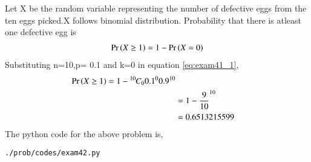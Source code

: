 Let X be the random variable representing the number of defective eggs from the ten eggs picked.X follows binomial distribution.
Probability that there is atleast one defective egg is 
\begin{align}
\Pr\left(X \geq 1\right)= 1 - \Pr\left(X=0\right) 
\end{align}
Substituting n=10,p= 0.1 and k=0 in equation \eqref{eq:exam41_1}, 
\begin{align}
\Pr\left(X \geq 1\right)= 1 - {{}^{10}\mkern-1muC_{0}}{0.1^0}{0.9^{10}}
\\
&=1-{\frac{9}{10}}^{10}
\\
&=0.6513215599
\end{align}
The python code for the above problem is,
\begin{lstlisting}
./prob/codes/exam42.py
\end{lstlisting}
